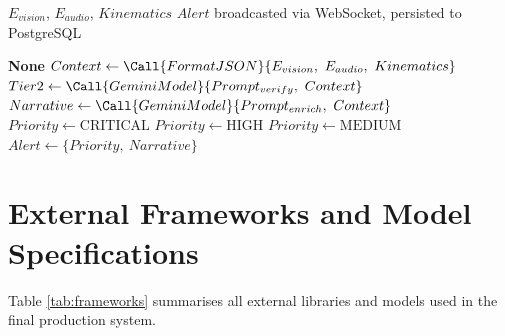 \begin{algorithm}[H]
\caption{Cognitive Core: Tiered LLM Verification and Enrichment}
\label{alg:cognitive}
\begin{algorithmic}[1]
\Require $E_{vision}$, $E_{audio}$, $Kinematics$
\Ensure $Alert$ broadcasted via WebSocket, persisted to PostgreSQL

    \State \Return \textbf{None}
\EndIf
\State $Context \gets \Call{FormatJSON}{E_{vision},\ E_{audio},\ Kinematics}$
\State $Tier2 \gets \Call{GeminiModel}{Prompt_{verify},\ Context}$
    \State $Narrative \gets \Call{GeminiModel}{Prompt_{enrich},\ Context}$
        \State $Priority \gets \text{CRITICAL}$
        \State $Priority \gets \text{HIGH}$
    \Else
        \State $Priority \gets \text{MEDIUM}$
    \EndIf
    \State $Alert \gets \{Priority,\ Narrative\}$
    \State {}
    \State {}
\Else
    \State {}
\EndIf
\end{algorithmic}
\end{algorithm}

\section{External Frameworks and Model Specifications}
\label{sec:frameworks}

Table \ref{tab:frameworks} summarises all external libraries and models used in
the final production system.


